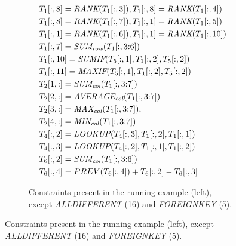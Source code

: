 \documentclass{IEEEtran}
\newcommand{\range}[3]{\ensuremath{#1[#2,#3]}}
\newcommand{\rangeto}[2]{#1{:}#2}
\newcommand{\rangeall}{:}
\newcommand{\eccalc}[2]{\ensuremath{#1 = #2}}
\newcommand{\ecrank}[2]{\eccalc{#1}{\textit{RANK}(#2)}}
\newcommand{\eclookupf}[4]{\ensuremath{\textit{LOOKUP}_{\textit{#4}}(#1, #2, #3)}}
\newcommand{\eclookup}[4]{\eccalc{#1}{\eclookupf{#2}{#3}{#4}{}}}
\newcommand{\ecaggc}[3]{\eccalc{#2}{\textit{#1\textsubscript{col}}(#3)}}
\newcommand{\ecsumc}[2]{\eccalc{#1}{\textit{SUM\textsubscript{col}}(#2)}}
\newcommand{\ecsumr}[2]{\eccalc{#1}{\textit{SUM\textsubscript{row}}(#2)}}
\newcommand{\ecaggif}[5]{\eccalc{#2}{\textit{#1IF}(#3, #4, #5)}}
\theoremstyle{definition}
\begin{document}
\begin{figure}[thb]
\begin{subfigure}{.30\textwidth}
{\begin{align*}
%
      &~\ecrank{\range{T_{1}}{\rangeall}{8}}{\range{T_{1}}{\rangeall}{3}}, \ecrank{\range{T_{1}}{\rangeall}{8}}{\range{T_{1}}{\rangeall}{4}} \\
      &~\ecrank{\range{T_{1}}{\rangeall}{8}}{\range{T_{1}}{\rangeall}{7}}, \ecrank{\range{T_{1}}{\rangeall}{1}}{\range{T_{1}}{\rangeall}{5}} \\
      &~\ecrank{\range{T_{1}}{\rangeall}{1}}{\range{T_{1}}{\rangeall}{6}}, \ecrank{\range{T_{1}}{\rangeall}{1}}{\range{T_{1}}{\rangeall}{10}} \\
%
      &~\ecsumr{\range{T_{1}}{\rangeall}{7}}{\range{T_{1}}{\rangeall}{\rangeto{3}{6}}} \\
%
      &~\ecaggif{\textit{SUM}}{\range{T_{1}}{\rangeall}{10}}{\range{T_{5}}{\rangeall}{1}}{\range{T_{1}}{\rangeall}{2}}{\range{T_{5}}{\rangeall}{2}} \\
%
      &~\ecaggif{\textit{MAX}}{\range{T_{1}}{\rangeall}{11}}{\range{T_{5}}{\rangeall}{1}}{\range{T_{1}}{\rangeall}{2}}{\range{T_{5}}{\rangeall}{2}} \\
%
      &~\ecsumc{\range{T_{2}}{1}{\rangeall}}{\range{T_{1}}{\rangeall}{\rangeto{3}{7}}} \\
%
      &~\ecaggc{\textit{AVERAGE}}{\range{T_{2}}{2}{\rangeall}}{\range{T_{1}}{\rangeall}{\rangeto{3}{7}}} \\
%
      &~\ecaggc{\textit{MAX}}{\range{T_{2}}{3}{\rangeall}}{\range{T_{1}}{\rangeall}{\rangeto{3}{7}}},  \\
%
      &~\ecaggc{\textit{MIN}}{\range{T_{2}}{4}{\rangeall}}{\range{T_{1}}{\rangeall}{\rangeto{3}{7}}} \\
%
      &~\eclookup{\range{T_{4}}{\rangeall}{2}}{\range{T_{4}}{\rangeall}{3}}{\range{T_{1}}{\rangeall}{2}}{\range{T_{1}}{\rangeall}{1}} \\
%
      &~\eclookup{\range{T_{4}}{\rangeall}{3}}{\range{T_{4}}{\rangeall}{2}}{\range{T_{1}}{\rangeall}{1}}{\range{T_{1}}{\rangeall}{2}} \\
%
      &~\ecsumc{\range{T_{6}}{\rangeall}{2}}{\range{T_{1}}{\rangeall}{\rangeto{3}{6}}} \\
%
      &~\range{T_{6}}{\rangeall}{4} = PREV(\range{T_{6}}{\rangeall}{4}) + \range{T_{6}}{\rangeall}{2} - \range{T_{6}}{\rangeall}{3}
    \end{align*}}
  \vspace{-10pt}
  \caption{Constraints present in the running example (left), except \textit{ALLDIFFERENT} (16) and \textit{FOREIGNKEY} (5).}
  \label{fig:sol_example}
\end{subfigure}
\end{figure}
\end{document}
